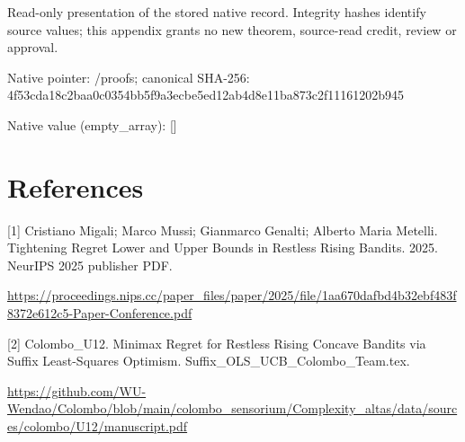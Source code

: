 \documentclass[10pt,a4paper]{article}
\begin{document}
Read-only presentation of the stored native record. Integrity hashes identify source values; this appendix grants no new theorem, source-read credit, review or approval.



Native pointer: /proofs; canonical SHA-256: 4f53cda18c2baa0c0354bb5f\allowbreak{}9a3ecbe5ed12ab4d8e11ba87\allowbreak{}3c2f11161202b945



Native value (empty\_array): []



\section{References}


[1] Cristiano Migali; Marco Mussi; Gianmarco Genalti; Alberto Maria Metelli. Tightening Regret Lower and Upper Bounds in Restless Rising Bandits. 2025. NeurIPS 2025 publisher PDF.



\url{https://proceedings.nips.cc/paper_files/paper/2025/file/1aa670dafbd4b32ebf483f8372e612c5-Paper-Conference.pdf}



[2] Colombo\_U12. Minimax Regret for Restless Rising Concave Bandits via Suffix Least-Squares Optimism. Suffix\_OLS\_UCB\_Colombo\_Team.tex.



\url{https://github.com/WU-Wendao/Colombo/blob/main/colombo_sensorium/Complexity_altas/data/sources/colombo/U12/manuscript.pdf}
\end{document}
